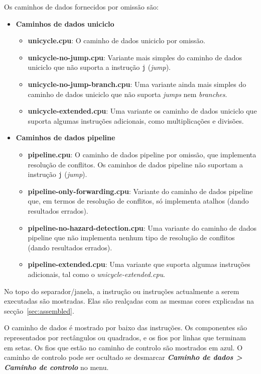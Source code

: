 \documentclass[11pt,a4paper,twoside,titlepage]{report}
\newcommand{\menupath}[1]{\textbf{\emph{#1}}}
\begin{document}
Os caminhos de dados fornecidos por omissão são:
\begin{itemize}
	\item \textbf{Caminhos de dados uniciclo}
	\begin{itemize}
		\item \textbf{unicycle.cpu}: O caminho de dados uniciclo por omissão.
		\item \textbf{unicycle-no-jump.cpu}: Variante mais simples do caminho
			de dados uniciclo que não suporta a instrução \verb+j+
			(\emph{jump}).
		\item \textbf{unicycle-no-jump-branch.cpu}: Uma variante ainda mais
			simples do caminho de dados uniciclo que não suporta \emph{jumps}
			nem \emph{branches}.
		\item \textbf{unicycle-extended.cpu}: Uma variante os caminho de dados
			uniciclo que suporta algumas instruções adicionais, como
			multiplicações e divisões.
	\end{itemize}
	
	\item \textbf{Caminhos de dados pipeline}
	\begin{itemize}
		\item \textbf{pipeline.cpu}: O caminho de dados pipeline por omissão,
			que implementa resolução de conflitos. Os caminhos de dados 
			pipeline não suportam a instrução \verb+j+ (\emph{jump}).
		\item \textbf{pipeline-only-forwarding.cpu}: Variante do caminho de 
			dados pipeline que, em termos de resolução de conflitos, só
			implementa atalhos (dando resultados errados).
		\item \textbf{pipeline-no-hazard-detection.cpu}: Uma variante do
			caminho de dados pipeline que não implementa nenhum tipo de
			resolução de conflitos (dando resultados errados).
		\item \textbf{pipeline-extended.cpu}: Uma variante que suporta algumas
			instruções adicionais, tal como o \emph{unicycle-extended.cpu}.
	\end{itemize}
\end{itemize}

No topo do separador/janela, a instrução ou instruções actualmente a serem
executadas são mostradas. Elas são realçadas com as mesmas cores explicadas
na secção~\ref{sec:assembled}.

O caminho de dados é mostrado por baixo das instruções.
Os componentes são representados por rectângulos ou quadrados, e os fios por
linhas que terminam em setas.
Os fios que estão no caminho de controlo são mostrados em azul.
O caminho de controlo pode ser ocultado se desmarcar
\menupath{Caminho de dados > Caminho de controlo} no menu.
\end{document}
